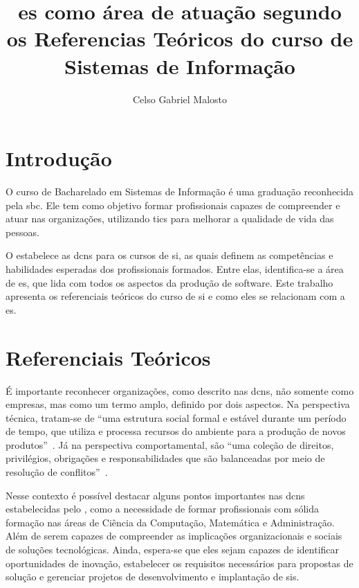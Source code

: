 \documentclass[12pt]{article}
\title{\gls{es} como área de atuação segundo os Referencias Teóricos do curso de Sistemas de Informação}
\author{Celso Gabriel Malosto\inst{1}}
\begin{document}
\maketitle

\begin{abstract}

\end{abstract}

\begin{resumo}

\end{resumo}

\section{Introdução}%
\label{sec:introducao}

O curso de Bacharelado em Sistemas de Informação é uma graduação reconhecida pela \gls{sbc}.
Ele tem como objetivo formar profissionais capazes de compreender e atuar nas organizações, utilizando \glspl{tic} para melhorar a qualidade de vida das pessoas.

O \textcite{mec2016dcn} estabelece as \glspl{dcn} para os cursos de \gls{si}, as quais definem as competências e habilidades esperadas dos profissionais formados.
Entre elas, identifica-se a área de \acrfull{es}, que lida com todos os aspectos da produção de software.
Este trabalho apresenta os referenciais teóricos do curso de \gls{si} e como eles se relacionam com a \gls{es}.

\section{Referenciais Teóricos}%
\label{sec:referenciais_teoricos}

É importante reconhecer organizações, como descrito nas \glspl{dcn}, não somente como empresas, mas como um termo amplo, definido por dois aspectos.
Na perspectiva técnica, tratam-se de ``uma estrutura social formal e estável durante um período de tempo, que utiliza e processa recursos do ambiente para a produção de novos produtos''~\cite{zorzo2017referenciais}.
Já na perspectiva comportamental, são ``uma coleção de direitos, privilégios, obrigações e responsabilidades que são balanceadas por meio de resolução de conflitos''~\cite{zorzo2017referenciais}.

Nesse contexto é possível destacar alguns pontos importantes nas \glspl{dcn} estabelecidas pelo \textcite{mec2016dcn}, como a necessidade de formar profissionais com sólida formação nas áreas de Ciência da Computação, Matemática e Administração.
Além de serem capazes de compreender as implicações organizacionais e sociais de soluções tecnológicas.
Ainda, espera-se que eles sejam capazes de identificar oportunidades de inovação, estabelecer os requisitos necessários para propostas de solução e gerenciar projetos de desenvolvimento e implantação de \glspl{si}.
\end{document}
